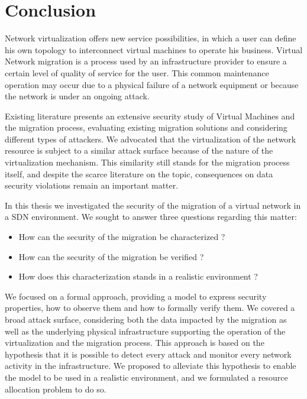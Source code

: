 \section{Conclusion}
\label{sec:thesis_conclusion}
Network virtualization offers new service possibilities, in which a user can define his own topology to interconnect virtual machines to operate his business.
Virtual Network migration is a process used by an infrastructure provider to ensure a certain level of quality of service for the user.
This common maintenance operation may occur due to a physical failure of a network equipment or because the network is under an ongoing attack.

Existing literature presents an extensive security study of Virtual Machines and the migration process, evaluating existing migration solutions and considering different types of attackers. We advocated that the virtualization of the network resource is subject to a similar attack surface because of the nature of the virtualization mechanism. This similarity still stands for the migration process itself, and despite the scarce literature on the topic, consequences on data security violations remain an important matter.

In this thesis we investigated the security of the migration of a virtual network in a SDN environment. 
We sought to answer three questions regarding this matter:

\begin{itemize}
    \item How can the security of the migration be characterized ?
    \item How can the security of the migration be verified ?
    \item How does this characterization stands in a realistic environment ?
\end{itemize}

We focused on a formal approach, providing a model to express security properties, how to observe them and how to formally verify them. 
We covered a broad attack surface, considering both the data impacted by the migration as well as the underlying physical infrastructure supporting the operation of the virtualization and the migration process. 
This approach is based on the hypothesis that it is possible to detect every attack and monitor every network activity in the infrastructure. 
We proposed to alleviate this hypothesis to enable the model to be used in a realistic environment, and we formulated a resource allocation problem to do so.

